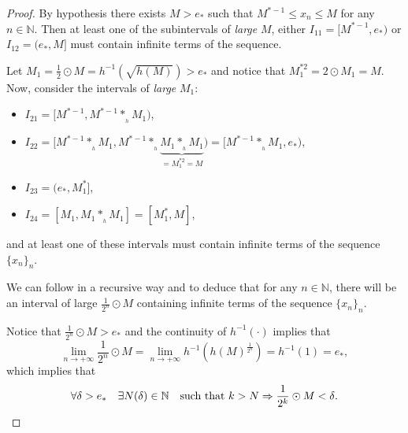 \documentclass[10pt]{amsart}
\numberwithin{equation}{section}
\begin{document}
\begin{proof}
By hypothesis there exists $M>e_{\ast}$ such that 
$M^{\ast -1} \leq x_{n} \leq M$ for any $n\in \mathbb{N}$.  Then at least one of the subintervals of \textit{large} $M$,
either $I_{11}=[M^{\ast-1},e_{\ast})$ or $I_{12}=(e_{\ast},M]$ must contain infinite terms of the sequence.

\medskip

Let $M_{1}=\frac{1}{2}\odot M=h^{-1}(\sqrt{h(M)})>e_{\ast}$ and notice that $M_{1}^{\ast 2}=2\odot M_{1}=M.$ Now, consider the intervals of \textit{large} $M_{1}:$
\begin{itemize}
\item $I_{21}=[M^{\ast-1},M^{\ast-1}\ast_{_h} M_{1})$, 
\item $I_{22}=[M^{\ast-1}\ast_{_h} M_{1},M^{\ast-1}\ast_{_h} \underbrace{M_{1}\ast_{_h}M_{1}}_{=M_{1}^{*2}=M})=[M^{\ast-1}\ast_{_h} M_{1},e_{\ast})$,
\item $I_{23}=(e_{\ast},M_{1}^{\ast}]$,
\item $I_{24}=[M_{1},M_{1}\ast_{_h} M_{1}]=[M_{1}^{\ast},M]$,
\end{itemize}
and  at least one of these intervals must contain infinite terms of the sequence $\{x_{n}\}_{n}$. 

We can follow in a recursive way and to deduce that for any $n\in \mathbb{N}$, there will be an interval
of large $\frac{1}{2^{n}}\odot M$ containing infinite terms of the sequence $\{x_{n}\}_{n}$.

\medskip
Notice that  $\frac{1}{2^{n}}\odot M>e_{\ast}$ and the continuity of $h^{-1}(\cdot)$ implies that
\begin{equation}
\nonumber 
\lim\limits_{n\to +\infty}\frac{1}{2^{n}}\odot M = 
\lim\limits_{n\to +\infty}
h^{-1}\left(h(M)^{\frac{1}{2^{n}}}\right)=h^{-1}(1)=e_{\ast},
\end{equation}
which implies that
\begin{equation}
\label{ae1}
\nonumber\forall \delta > e_* \quad \exists N(\delta)\in \mathbb{N} \quad \textnormal{such that $k>N \Rightarrow \frac{1}{2^{k}}\odot M <\delta$}.
\end{equation}

\end{proof}
\end{document}
